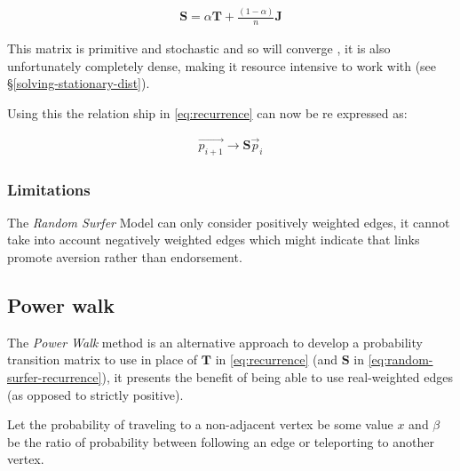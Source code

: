 \documentclass[11pt]{report}
\begin{document}
\begin{align}
\mathbf{S} = \alpha \mathbf{T} + \frac{(1- \alpha)}{n} \mathbf{J} \label{eq:random-surfer}
\end{align}

This matrix is primitive and stochastic and so will converge
\cite[]{langvilleGooglePageRankScience2012}, it is also
unfortunately completely dense, making it resource intensive to work with (see
\S \ref{solving-stationary-dist}).

Using this the relation ship in \eqref{eq:recurrence} can now be re
expressed as:

\begin{align}
\vec{p_{i+1}} \rightarrow \mathbf{S} \vec{p}_{i} \label{eq:random-surfer-recurrence}
\end{align}






\subsubsection{Limitations}
\label{sec:org725b0b3}
The \emph{Random Surfer} Model can only consider positively weighted edges, it cannot
take into account negatively weighted edges which might indicate that
links promote aversion rather than endorsement.



\subsection{Power walk}
\label{pwalk}



The \emph{Power Walk} method is an alternative approach to develop a probability
transition matrix to use in place of \(\mathbf{T}\) in \eqref{eq:recurrence} (and \(\mathbf{S}\) in \eqref{eq:random-surfer-recurrence}), it presents the benefit of being able to use real-weighted edges (as opposed to strictly positive).

Let the probability of traveling to a non-adjacent vertex be some value \(x\)
and \(\beta\) be the ratio of probability between following an edge or
teleporting to another vertex.
\end{document}
